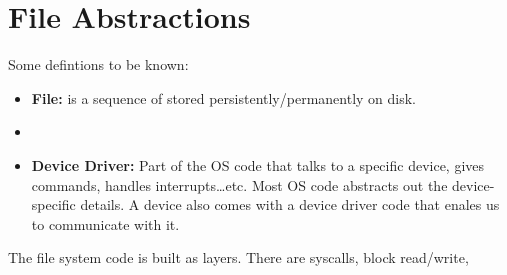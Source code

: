 \documentclass[12pt]{article}
\begin{document}
\section{File Abstractions}

Some defintions to be known:
\begin{itemize}
    \item\textbf{File:} is a sequence of stored persistently/permanently on disk.
    \item 
    \item \textbf{Device Driver:} Part of the OS code that talks to a specific device, gives commands, handles interrupts\ldots etc. Most OS code abstracts out the 
    device-specific details. A device also comes with a device driver code that enales us to communicate with it. 
\end{itemize}

The file system code is built as layers. There are syscalls, block read/write, 

\end{document}

